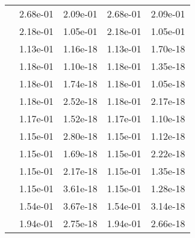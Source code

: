 \begin{table}
\begin{tabular}{c|cc|cc|}
\multicolumn{1}{|c|}{} & \multicolumn{1}{|c|}{  2.68e-01} & \multicolumn{1}{|c|}{  2.09e-01} & \multicolumn{1}{|c|}{  2.68e-01} & \multicolumn{1}{|c|}{  2.09e-01} \\ 
\multicolumn{1}{|c|}{} & \multicolumn{1}{|c|}{  2.18e-01} & \multicolumn{1}{|c|}{  1.05e-01} & \multicolumn{1}{|c|}{  2.18e-01} & \multicolumn{1}{|c|}{  1.05e-01} \\ 
\multicolumn{1}{|c|}{} & \multicolumn{1}{|c|}{  1.13e-01} & \multicolumn{1}{|c|}{  1.16e-18} & \multicolumn{1}{|c|}{  1.13e-01} & \multicolumn{1}{|c|}{  1.70e-18} \\ 
\multicolumn{1}{|c|}{} & \multicolumn{1}{|c|}{  1.18e-01} & \multicolumn{1}{|c|}{  1.10e-18} & \multicolumn{1}{|c|}{  1.18e-01} & \multicolumn{1}{|c|}{  1.35e-18} \\ 
\multicolumn{1}{|c|}{} & \multicolumn{1}{|c|}{  1.18e-01} & \multicolumn{1}{|c|}{  1.74e-18} & \multicolumn{1}{|c|}{  1.18e-01} & \multicolumn{1}{|c|}{  1.05e-18} \\ 
\multicolumn{1}{|c|}{} & \multicolumn{1}{|c|}{  1.18e-01} & \multicolumn{1}{|c|}{  2.52e-18} & \multicolumn{1}{|c|}{  1.18e-01} & \multicolumn{1}{|c|}{  2.17e-18} \\ 
\multicolumn{1}{|c|}{} & \multicolumn{1}{|c|}{  1.17e-01} & \multicolumn{1}{|c|}{  1.52e-18} & \multicolumn{1}{|c|}{  1.17e-01} & \multicolumn{1}{|c|}{  1.10e-18} \\ 
\multicolumn{1}{|c|}{} & \multicolumn{1}{|c|}{  1.15e-01} & \multicolumn{1}{|c|}{  2.80e-18} & \multicolumn{1}{|c|}{  1.15e-01} & \multicolumn{1}{|c|}{  1.12e-18} \\ 
\multicolumn{1}{|c|}{} & \multicolumn{1}{|c|}{  1.15e-01} & \multicolumn{1}{|c|}{  1.69e-18} & \multicolumn{1}{|c|}{  1.15e-01} & \multicolumn{1}{|c|}{  2.22e-18} \\ 
\multicolumn{1}{|c|}{} & \multicolumn{1}{|c|}{  1.15e-01} & \multicolumn{1}{|c|}{  2.17e-18} & \multicolumn{1}{|c|}{  1.15e-01} & \multicolumn{1}{|c|}{  1.35e-18} \\ 
\multicolumn{1}{|c|}{} & \multicolumn{1}{|c|}{  1.15e-01} & \multicolumn{1}{|c|}{  3.61e-18} & \multicolumn{1}{|c|}{  1.15e-01} & \multicolumn{1}{|c|}{  1.28e-18} \\ 
\multicolumn{1}{|c|}{} & \multicolumn{1}{|c|}{  1.54e-01} & \multicolumn{1}{|c|}{  3.67e-18} & \multicolumn{1}{|c|}{  1.54e-01} & \multicolumn{1}{|c|}{  3.14e-18} \\ 
\multicolumn{1}{|c|}{} & \multicolumn{1}{|c|}{  1.94e-01} & \multicolumn{1}{|c|}{  2.75e-18} & \multicolumn{1}{|c|}{  1.94e-01} & \multicolumn{1}{|c|}{  2.66e-18} \\ 

\end{tabular}
\end{table}
